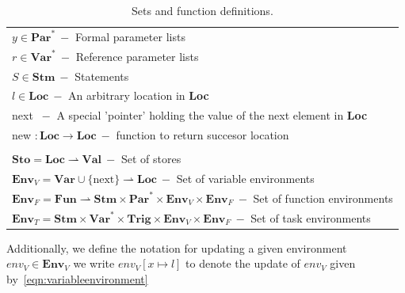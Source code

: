 \begin{table}[htb!]
\begin{tabular}{l}
        $y \in \textbf{Par}^*\ -$ Formal parameter lists                                                                                                               \\
        $r \in \textbf{Var}^*\ -$ Reference parameter lists                                                                                                            \\
        $S \in \textbf{Stm}\ -$ Statements                                                                                                                             \\
        $l \in \textbf{Loc}\ -$ An arbitrary location in \textbf{Loc}                                                                                                  \\
        next $\ -$ A special 'pointer' holding the value of the next element in \textbf{Loc}                                                                           \\
        new $: \textbf{Loc} \rightarrow \textbf{Loc}\ -$ function to return succesor location                                                                          \\
        \\
        $\textbf{Sto} = \textbf{Loc} \rightharpoonup \textbf{Val}\ -$ Set of stores                                                                                    \\
        $\textbf{Env}_V = \textbf{Var} \cup \{\text{next}\} \rightharpoonup \textbf{Loc}\ -$ Set of variable environments                                              \\
        $\textbf{Env}_F = \textbf{Fun} \rightharpoonup \textbf{Stm} \times \textbf{Par}^* \times \textbf{Env}_V \times \textbf{Env}_F\ -$ Set of function environments \\
        $\textbf{Env}_T = \textbf{Stm} \times \textbf{Var}^* \times \textbf{Trig} \times \textbf{Env}_V \times \textbf{Env}_F\ -$ Set of task environments             \\
        \bottomrule
    \end{tabular}
    \caption{Sets and function definitions.}
    \label{tab:setsandfunctions}
\end{table}


Additionally, we define the notation for updating a given environment $env_V \in \textbf{Env}_V$ we write $env_V[ x \mapsto l]$ to denote the update of $env_V$ given by~\ref{eqn:variableenvironment}


